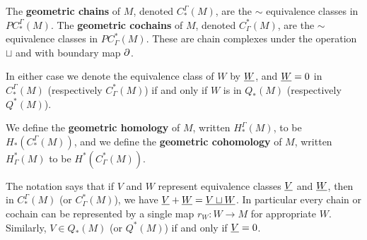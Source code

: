 \begin{definition}
The \textbf{geometric chains} of $M$, denoted $C^\Gamma_*(M)$, are the $\sim$ equivalence classes in $PC^\Gamma_*(M)$.
The \textbf{geometric cochains} of $M$, denoted $C_\Gamma^*(M)$, are the $\sim$ equivalence classes in $PC_\Gamma^*(M)$.
These are chain complexes under the operation $\sqcup$ and with boundary map $\partial$.

In either case we denote the equivalence class of $W$ by $\underline{W}$, and $\underline{W}=0$ in $C^\Gamma_*(M)$ (respectively $C_\Gamma^*(M)$) if and only if $W$ is in $Q_*(M)$ (respectively $Q^*(M)$).

We define the \textbf{geometric homology} of $M$, written $H_*^\Gamma(M)$,  to be $H_*(C^\Gamma_*(M))$, and
we define the \textbf{geometric cohomology} of $M$, written $H^*_\Gamma(M)$  to be $H^*(C_\Gamma^*(M))$.
\end{definition}

The notation says that if $V$ and $W$ represent equivalence classes $\underline{V}$ and $\underline{W}$, then in $C_*^{\Gamma}(M)$ (or $C^*_\Gamma(M)$), we have $\underline{V}+\underline{W}=\underline{V\sqcup W}$. In particular every chain or cochain can be represented by a single map $r_W:W\to M$ for appropriate $W$. Similarly, $V\in Q_*(M)$ (or $Q^*(M)$) if and only if $\underline{V}=0$.


